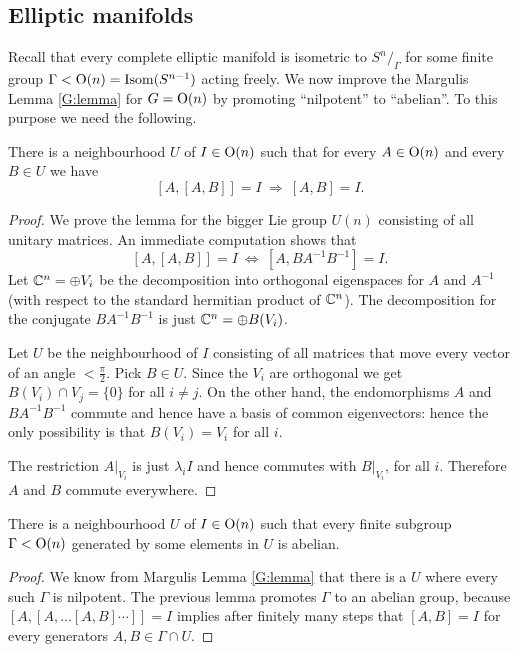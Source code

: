 \subsection{Elliptic manifolds}
Recall that every complete elliptic manifold is isometric to $S^n/_\Gamma$ for some finite group $\Gamma < {\rm O}(n) = {\rm Isom}(S^{n-1})$ acting freely. We now improve the Margulis Lemma \ref{G:lemma} for $G={\rm O}(n)$ by promoting ``nilpotent'' to ``abelian''. To this purpose we need the following.

\begin{lemma} \label{backwards:lemma}
There is a neighbourhood $U$ of $I\in {\rm O}(n)$ such that for every $A\in {\rm O}(n)$ and every $B\in U$ we have
$$[A,[A,B]] = I\ \Longrightarrow\ [A,B] = I.$$
\end{lemma}
\begin{proof}
We prove the lemma for the bigger Lie group $U(n)$ consisting of all unitary matrices. An immediate computation shows that
$$[A,[A,B]]=I \ \Longleftrightarrow\ [A, BA^{-1}B^{-1}] = I.$$
Let $\mathbb{C}^n = \oplus V_i$ be the decomposition into orthogonal eigenspaces for $A$ and $A^{-1}$ (with respect to the standard hermitian product of $\mathbb{C}^n$). The decomposition for the conjugate $BA^{-1}B^{-1}$ is just $\mathbb{C}^n = \oplus B(V_i)$. 

Let $U$ be the neighbourhood of $I$ consisting of all matrices that move every vector of an angle $< \frac \pi 2$. Pick $B\in U$. Since the $V_i$ are orthogonal we get $B(V_i) \cap V_j = \{0\}$ for all $i\neq j$. On the other hand, the endomorphisms $A$ and $BA^{-1}B^{-1}$ commute and hence have a basis of common eigenvectors: hence the only possibility is that $B(V_i) = V_i$ for all $i$. 

The restriction $A|_{V_i}$ is just $\lambda_iI$ and hence commutes with $B|_{V_i}$, for all $i$. Therefore $A$ and $B$ commute everywhere.
\end{proof}

\begin{cor} \label{U:O(n):cor}
There is a neighbourhood $U$ of $I\in {\rm O}(n)$ such that every finite subgroup $\Gamma < {\rm O}(n)$ generated by some elements in $U$ is abelian.
\end{cor}
\begin{proof}
We know from Margulis Lemma \ref{G:lemma} that there is a $U$ where every such $\Gamma$ is nilpotent. The previous lemma promotes $\Gamma$ to an abelian group, because $[A,[A, \ldots [A,B]\cdots]] = I$ implies after finitely many steps that $[A,B] = I$ for every generators $A,B\in \Gamma \cap U$.
\end{proof}

